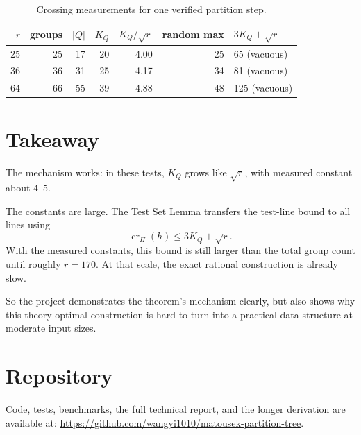 \documentclass[10pt,a4paper]{article}
\begin{document}
\begin{table}[H]
\centering
\caption{Crossing measurements for one verified partition step.}
\begin{tabular}{@{}rrrrrrl@{}}
\toprule
$r$ & groups & $|Q|$ & $K_Q$ & $K_Q/\sqrt r$ &
  random max & $3K_Q+\sqrt r$ \\
\midrule
25  & 25 & 17 & 20 & 4.00 & 25 & 65 (vacuous) \\
36  & 36 & 31 & 25 & 4.17 & 34 & 81 (vacuous) \\
64  & 66 & 55 & 39 & 4.88 & 48 & 125 (vacuous) \\
\bottomrule
\end{tabular}
\end{table}

\vspace{-0.6em}

\section*{Takeaway}

The mechanism works: in these tests, $K_Q$ grows like $\sqrt r$, with
measured constant about $4$--$5$.

The constants are large. The Test Set Lemma transfers the test-line
bound to all lines using
\[
  \operatorname{cr}_\Pi(h)\le 3K_Q+\sqrt r.
\]
With the measured constants, this bound is still larger than the
total group count until roughly $r=170$. At that scale, the exact
rational construction is already slow.

So the project demonstrates the theorem's mechanism clearly, but also
shows why this theory-optimal construction is hard to turn into a
practical data structure at moderate input sizes.

\section*{Repository}

Code, tests, benchmarks, the full technical report, and the longer
derivation are available at:
\url{https://github.com/wangyi1010/matousek-partition-tree}.
\end{document}
